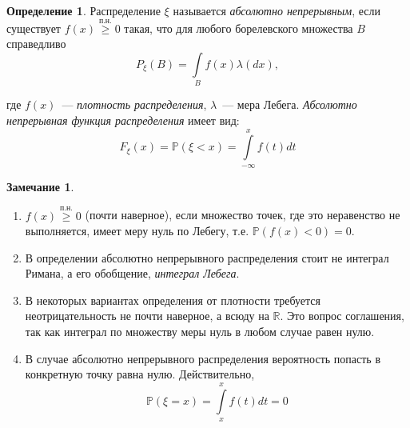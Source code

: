\documentclass[oneside,final,14pt]{extreport}
\theoremstyle{plain}
\theoremstyle{definition}
\newtheorem*{defn}{Определение}
\newtheorem*{rmrk}{Замечание}
\theoremstyle{named}
\begin{document}
\begin{defn}
    Распределение $\xi$ называется {\it абсолютно непрерывным}, если существует $f(x) \overset{\text{п.н.}}{\geqslant} 0$ такая, что для любого борелевского множества $B$ справедливо
    \begin{equation*}
        P_\xi(B) = \int\limits_B f(x) \lambda(dx),
    \end{equation*}
    
    где $f(x)$~--- {\it плотность распределения}, $\lambda$~--- мера Лебега. \textit{Абсолютно непрерывная функция распределения} имеет вид:
    \begin{equation*}
        F_\xi(x) = \mathbb{P}(\xi < x) = \int\limits_{-\infty}^x f(t)dt
    \end{equation*}
\end{defn}
\begin{rmrk}
\begin{enumerate}\leavevmode
    \item $f(x) \overset{\text{п.н.}}{\geqslant} 0$ (почти наверное), если множество точек, где это неравенство не выполняется, имеет меру нуль по Лебегу, т.е. $\mathbb{P}(f(x) < 0) = 0$.
    \item В определении абсолютно непрерывного распределения стоит не интеграл Римана, а его обобщение, \textit{интеграл Лебега}.
    \item В некоторых вариантах определения от плотности требуется неотрицательность не почти наверное, а всюду на $\mathbb{R}$. Это вопрос соглашения, так как интеграл по множеству меры нуль в любом случае равен нулю.
    \item В случае абсолютно непрерывного распределения вероятность попасть в конкретную точку равна нулю. Действительно,
    \begin{equation*}
        \mathbb{P}(\xi = x) = \int\limits_{x}^{x} f(t)dt = 0
    \end{equation*}
\end{enumerate}
\end{rmrk}
\end{document}

